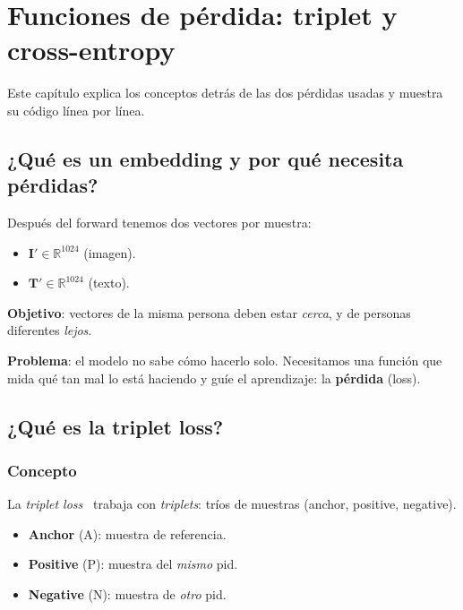 \chapter{Funciones de pérdida: triplet y cross-entropy}
\label{cap:losses}

Este capítulo explica los conceptos detrás de las dos pérdidas
usadas y muestra su código línea por línea.

\section{¿Qué es un embedding y por qué necesita pérdidas?}

Después del forward tenemos dos vectores por muestra:
\begin{itemize}
  \item $\mathbf{I}' \in \mathbb{R}^{1024}$ (imagen).
  \item $\mathbf{T}' \in \mathbb{R}^{1024}$ (texto).
\end{itemize}

\noindent\textbf{Objetivo}: vectores de la misma persona deben
estar \emph{cerca}, y de personas diferentes \emph{lejos}.

\noindent\textbf{Problema}: el modelo no sabe cómo hacerlo solo.
Necesitamos una función que mida qué tan mal lo está haciendo y
guíe el aprendizaje: la \textbf{pérdida} (loss).

\section{¿Qué es la triplet loss?}

\subsection{Concepto}

La \emph{triplet loss}~\cite{schroff2015facenet} trabaja con
\emph{triplets}: tríos de muestras (anchor, positive, negative).

\begin{itemize}
  \item \textbf{Anchor} (A): muestra de referencia.
  \item \textbf{Positive} (P): muestra del \emph{mismo} pid.
  \item \textbf{Negative} (N): muestra de \emph{otro} pid.
\end{itemize}

